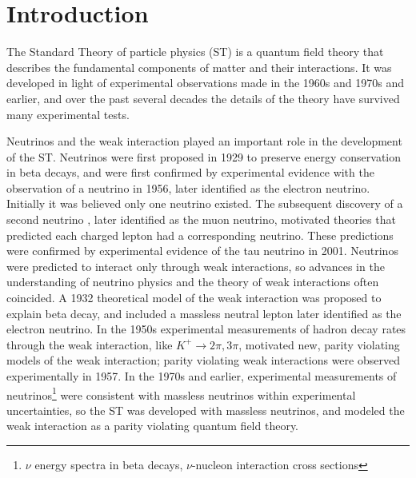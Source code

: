 \chapter{Introduction}
\label{intro_chapter}

The Standard Theory of particle physics (ST) \cite{weinbergSM,salamSM} 
is a quantum field theory that describes the fundamental components of matter and their interactions.  It 
was developed in light of experimental observations made in the 1960s and 1970s and earlier, and over the past 
several decades the details of the theory have survived many experimental tests.

Neutrinos and the weak interaction played an important role in the development of the ST.  
Neutrinos were first proposed in 1929 to preserve energy conservation in beta decays, and were first 
confirmed by experimental evidence \cite{firstNuDiscovery} with the observation of a neutrino in 1956, 
later identified as the electron neutrino.  Initially it was believed only one neutrino existed.  The 
subsequent discovery of a second neutrino \cite{muNuDiscovery}, later identified as the muon neutrino, 
motivated theories that predicted each charged lepton had a corresponding neutrino.  These predictions 
were confirmed by experimental evidence \cite{tauNuDiscovery} of the tau neutrino in 2001.  
Neutrinos were predicted to interact only through weak 
interactions, so advances in the understanding of neutrino physics and the theory of weak interactions often coincided.  
A 1932 theoretical model of the weak interaction was proposed to explain beta decay, and included a massless 
neutral lepton later identified as the electron neutrino.  In the 1950s experimental measurements of 
hadron decay rates through the weak interaction, like $K^{+} \rightarrow 2\pi, 3\pi$, motivated new, 
parity violating models of the weak interaction; parity violating weak interactions were 
observed experimentally \cite{weakParityViolation} in 1957.  In the 1970s and earlier, experimental measurements 
of neutrinos\footnote{$\nu$ energy spectra in beta decays, $\nu$-nucleon interaction cross sections} were 
consistent with massless neutrinos within experimental uncertainties, so the ST was developed with massless 
neutrinos, and modeled the weak interaction as a parity violating quantum field theory.


